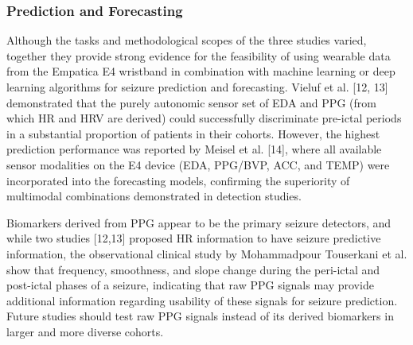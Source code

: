 \subsubsection{Prediction and Forecasting}
Although the tasks and methodological scopes of the three studies varied, together they provide strong evidence for the feasibility of using wearable data from the Empatica E4 wristband in combination with machine learning or deep learning algorithms for seizure prediction and forecasting. Vieluf et al. [12, 13] demonstrated that the purely autonomic sensor set of EDA and PPG (from which HR and HRV are derived) could successfully discriminate pre-ictal periods in a substantial proportion of patients in their cohorts. However, the highest prediction performance was reported by Meisel et al. [14], where all available sensor modalities on the E4 device (EDA, PPG/BVP, ACC, and TEMP) were incorporated into the forecasting models, confirming the superiority of multimodal combinations demonstrated in detection studies. 

Biomarkers derived from PPG appear to be the primary seizure detectors, and while two studies [12,13] proposed HR information to have seizure predictive information, the observational clinical study by Mohammadpour Touserkani et al. \cite{Mohammadpour_Touserkani2020-tk} show that frequency, smoothness, and slope change during the peri-ictal and post-ictal phases of a seizure, indicating that raw PPG signals may provide additional information regarding usability of these signals for seizure prediction. Future studies should test raw PPG signals instead of its derived biomarkers in larger and more diverse cohorts.